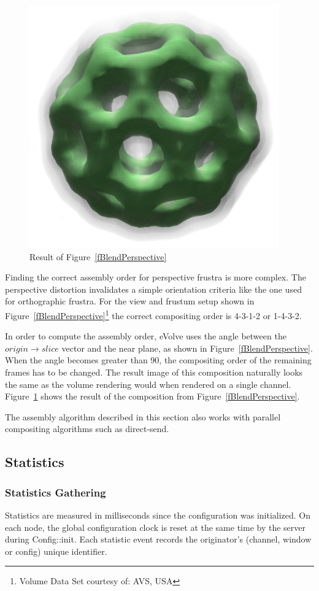 \documentclass[10pt,a4]{scrartcl}
\newcommand{\fig}[1]{Figure~\ref{#1}}
\begin{document}
\begin{figure}
  \includegraphics[width=.382\textwidth]{images/volResult.png}
  {\caption{\small\label{fVolResult}Result of \fig{fBlendPerspective}}}
\end{figure}
Finding the correct assembly order for perspective frustra is more
complex. The perspective distortion invalidates a simple orientation
criteria like the one used for orthographic frustra. For the view and
frustum setup shown in \fig{fBlendPerspective}\footnote{Volume Data Set
  courtesy of: AVS, USA} the correct compositing order is 4-3-1-2 or
1-4-3-2.

In order to compute the assembly order, \textsf{eVolve} uses the angle
between the $origin \rightarrow slice$ vector and the near plane, as shown
in \fig{fBlendPerspective}. When the angle becomes greater than
90\textdegree, the compositing order of the remaining frames has to be
changed. The result image of this composition naturally looks the same
as the volume rendering would when rendered on a single
channel. \fig{fVolResult} shows the result of the composition from
\fig{fBlendPerspective}.

The assembly algorithm described in this section also works with parallel
compositing algorithms such as direct-send. 


\subsection{Statistics}

\subsubsection{Statistics Gathering}

Statistics are measured in milliseconds since the configuration was
initialized. On each node, the global configuration clock is reset at
the same time by the server during \textsf{Config::init}. Each statistic
event records the originator's (channel, window or config) unique
identifier.
\end{document}
